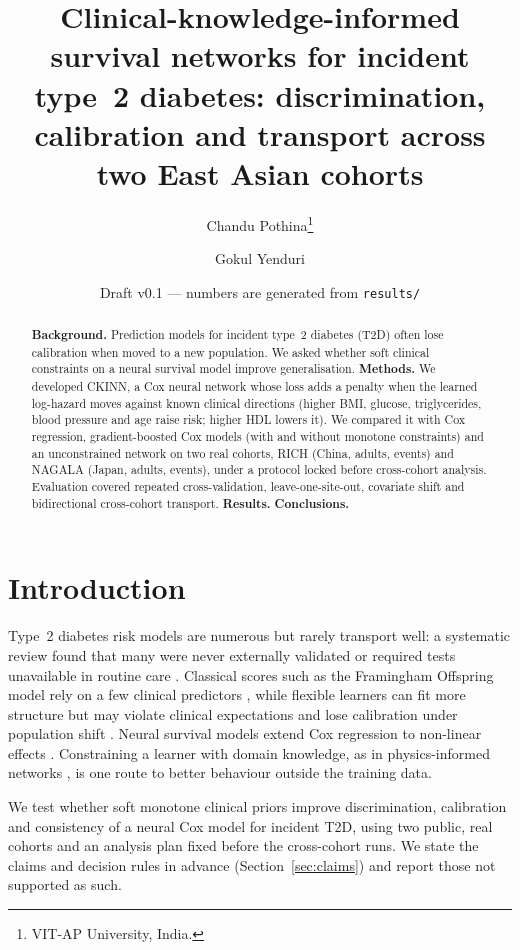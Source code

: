 \documentclass[11pt]{article}
\title{Clinical-knowledge-informed survival networks for incident type~2 diabetes: discrimination, calibration and transport across two East Asian cohorts}
\author{Chandu Pothina\thanks{VIT-AP University, India.} \and Gokul Yenduri}
\date{Draft v0.1 --- numbers are generated from \texttt{results/}}
\begin{document}
\maketitle
\begin{abstract}
\textbf{Background.} Prediction models for incident type~2 diabetes (T2D) often lose calibration when moved to a new population. We asked whether soft clinical constraints on a neural survival model improve generalisation.
\textbf{Methods.} We developed CKINN, a Cox neural network whose loss adds a penalty when the learned log-hazard moves against known clinical directions (higher BMI, glucose, triglycerides, blood pressure and age raise risk; higher HDL lowers it). We compared it with Cox regression, gradient-boosted Cox models (with and without monotone constraints) and an unconstrained network on two real cohorts, RICH (China, \nrich{} adults, \evrich{} events) and NAGALA (Japan, \nnagala{} adults, \evnagala{} events), under a protocol locked before cross-cohort analysis. Evaluation covered repeated cross-validation, leave-one-site-out, covariate shift and bidirectional cross-cohort transport.
\textbf{Results.} 
\textbf{Conclusions.} 
\end{abstract}

\section{Introduction}
Type~2 diabetes risk models are numerous but rarely transport well: a systematic review found that many were never externally validated or required tests unavailable in routine care \citep{noble2011}. Classical scores such as the Framingham Offspring model rely on a few clinical predictors \citep{wilson2007}, while flexible learners can fit more structure but may violate clinical expectations and lose calibration under population shift \citep{vancalster2019}. Neural survival models extend Cox regression to non-linear effects \citep{katzman2018}. Constraining a learner with domain knowledge, as in physics-informed networks \citep{raissi2019}, is one route to better behaviour outside the training data.

We test whether soft monotone clinical priors improve discrimination, calibration and consistency of a neural Cox model for incident T2D, using two public, real cohorts and an analysis plan fixed before the cross-cohort runs. We state the claims and decision rules in advance (Section~\ref{sec:claims}) and report those not supported as such.
\end{document}
